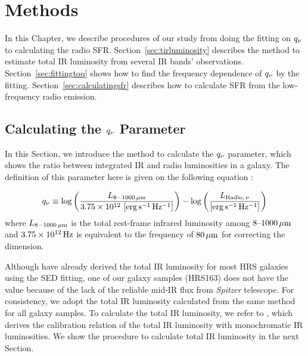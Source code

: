 \chapter{Methods}\label{chap:methods}
\begin{chapabstract}

In this Chapter, we describe procedures of our study from doing the fitting on $q_{\nu}$ to calculating the radio SFR\@.
Section~\ref{sec:tirluminosity} describes the method to estimate total IR luminosity from several IR bands' observations.
Section~\ref{sec:fittingtoq} shows how to find the frequency dependence of $q_{\nu}$ by the fitting.
Section~\ref{sec:calculatingsfr} describes how to calculate SFR from the low-frequency radio emission.

\end{chapabstract}

\section{Calculating the $q_{\nu}$ Parameter}\label{sec:calculatingq}
In this Section, we introduce the method to calculate the $q_{\nu}$ parameter, which shows the ratio between integrated IR and radio luminosities in a galaxy.
The definition of this parameter here is given on the following equation \citep[e.g.,][]{Helou1985, Bell2003, CalistroRivera2017a}:

\begin{equation}\label{eq:q_def}
    q_{\nu} \equiv \log\left(\frac{L_{\mathrm{8-1000\,\mu m}}}{3.75 \times 10^{12}\,\left[{\rm erg\,s^{-1}\,Hz^{-1}}\right]}\right) - \log\left(\frac{L_{\mathrm{Radio},\,\nu}}{\left[{\rm erg\,s^{-1}\,Hz^{-1}}\right]}\right)
\end{equation}
where $L_{\mathrm{8-1000\,\mu m}}$ is the total rest-frame infrared luminosity among $8 \mbox{--} 1000\,\mathrm{\mu m}$ and $3.75\times10^{12}\,\mathrm{Hz}$ is equivalent to the frequency of $80\,\mathrm{\mu m}$ for correcting the dimension.

Although \citet{Ciesla2014} have already derived the total IR luminosity for most HRS galaxies using the SED fitting, one of our galaxy samples (HRS163) does not have the value because of the lack of the reliable mid-IR flux from {\it Spitzer\/} telescope.
For consistency, we adopt the total IR luminosity calculated from the same method for all galaxy samples.
To calculate the total IR luminosity, we refer to \citet{Galametz2013}, which derives the calibration relation of the total IR luminosity with monochromatic IR luminosities.
We show the procedure to calculate total IR luminosity in the next Section.



